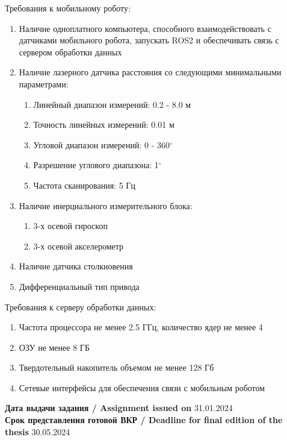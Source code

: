 \begin{small}
\noindent
Требования к мобильному роботу:
    \begin{enumerate}
        \item Наличие одноплатного компьютера, способного взаимодействовать с датчиками мобильного робота, запускать ROS2 и обеспечивать связь с сервером обработки данных
        \item Наличие лазерного датчика расстояния со следующими минимальными параметрами:
        \begin{enumerate}
            \item Линейный диапазон измерений: 0.2 - 8.0 м
            \item Точность линейных измерений: 0.01 м
            \item Угловой диапазон измерений: 0 - 360$^{\circ}$
            \item Разрешение углового диапазона: 1$^{\circ}$
            \item Частота сканирования: 5 Гц
        \end{enumerate}
        \item Наличие инерциального измерительного блока:
        \begin{enumerate}
            \item 3-х осевой гироскоп
            \item 3-х осевой акселерометр
        \end{enumerate}
        \item Наличие датчика столкновения
        \item Дифференциальный тип привода
    \end{enumerate}

\noindent
Требования к серверу обработки данных:
    \begin{enumerate}
        \item Частота процессора не менее 2.5 ГГц, количество ядер не менее 4
        \item ОЗУ не менее 8 ГБ
        \item Твердотельный накопитель объемом не менее 128 Гб
        \item Сетевые интерфейсы для обеспечения связи с мобильным роботом
    \end{enumerate}

\vspace{25pt}
\noindent
\textbf{Дата выдачи задания / Assignment issued on} 31.01.2024 \\
\textbf{Срок представления готовой ВКР / Deadline for final edition of the thesis} 30.05.2024 \\
\end{small}
